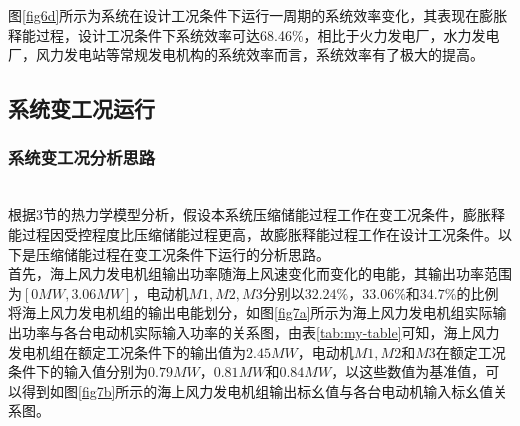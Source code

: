 \documentclass[journal,onecolumn]{IEEEtran}
\begin{document}
图\ref{fig6d}所示为系统在设计工况条件下运行一周期的系统效率变化，其表现在膨胀释能过程，设计工况条件下系统效率可达68.46\%，相比于火力发电厂，水力发电厂，风力发电站等常规发电机构的系统效率而言，系统效率有了极大的提高。

\subsection{系统变工况运行}
\subsubsection{系统变工况分析思路}\ \\

根据3节的热力学模型分析，假设本系统压缩储能过程工作在变工况条件，膨胀释能过程因受控程度比压缩储能过程更高，故膨胀释能过程工作在设计工况条件。以下是压缩储能过程在变工况条件下运行的分析思路。\\


首先，海上风力发电机组输出功率随海上风速变化而变化的电能，其输出功率范围为$ [0MW,3.06MW] $，电动机$ M1,M2,M3 $分别以$ 32.24\%，33.06\% $和$ 34.7\% $的比例将海上风力发电机组的输出电能划分，如图\ref{fig7a}所示为海上风力发电机组实际输出功率与各台电动机实际输入功率的关系图，由表\ref{tab:my-table}可知，海上风力发电机组在额定工况条件下的输出值为$ 2.45MW $，电动机$ M1,M2 $和$ M3 $在额定工况条件下的输入值分别为$ 0.79MW，0.81MW $和$ 0.84MW $，以这些数值为基准值，可以得到如图\ref{fig7b}所示的海上风力发电机组输出标幺值与各台电动机输入标幺值关系图。
\end{document}
